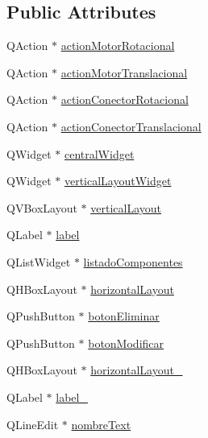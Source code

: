 \subsection*{Public Attributes}
\begin{DoxyCompactItemize}
\item 
Q\-Action $\ast$ \hyperlink{class_ui___main_window_a001c088d0b54f83119a6f036032303ae}{action\-Motor\-Rotacional}
\item 
Q\-Action $\ast$ \hyperlink{class_ui___main_window_a0092ec0757cfff7e42af2f26499e643d}{action\-Motor\-Translacional}
\item 
Q\-Action $\ast$ \hyperlink{class_ui___main_window_a930c8685d6cf6b7bda6264eedbb05076}{action\-Conector\-Rotacional}
\item 
Q\-Action $\ast$ \hyperlink{class_ui___main_window_a24126fcd6cef35a2a515a20a7a16dfec}{action\-Conector\-Translacional}
\item 
Q\-Widget $\ast$ \hyperlink{class_ui___main_window_a30075506c2116c3ed4ff25e07ae75f81}{central\-Widget}
\item 
Q\-Widget $\ast$ \hyperlink{class_ui___main_window_a805d415fff07a22a85219e1f22f2da28}{vertical\-Layout\-Widget}
\item 
Q\-V\-Box\-Layout $\ast$ \hyperlink{class_ui___main_window_aecd96a04789fcfec3f98d80390ad8184}{vertical\-Layout}
\item 
Q\-Label $\ast$ \hyperlink{class_ui___main_window_ad9c89133780f28e6efa2ec17ceb9cff5}{label}
\item 
Q\-List\-Widget $\ast$ \hyperlink{class_ui___main_window_ac79ae486ca255cf94a11582f0571169c}{listado\-Componentes}
\item 
Q\-H\-Box\-Layout $\ast$ \hyperlink{class_ui___main_window_acd6fdc9ebacc4b25b834162380d75ce8}{horizontal\-Layout}
\item 
Q\-Push\-Button $\ast$ \hyperlink{class_ui___main_window_a76639ddaaaf44f4a320888260cb5cc51}{boton\-Eliminar}
\item 
Q\-Push\-Button $\ast$ \hyperlink{class_ui___main_window_adbef6b25bd889b44e80e137ac1427ccb}{boton\-Modificar}
\item 
Q\-H\-Box\-Layout $\ast$ \hyperlink{class_ui___main_window_a80867018070156432923d0266cc9fe25}{horizontal\-Layout\-\_}
\item 
Q\-Label $\ast$ \hyperlink{class_ui___main_window_a2e2516d755e4dd53fc905dabddf2738a}{label\-\_}
\item 
Q\-Line\-Edit $\ast$ \hyperlink{class_ui___main_window_aa827386dfe7cc92ef98c3075e3265d20}{nombre\-Text}

\end{DoxyCompactItemize}

